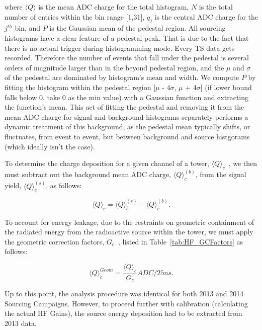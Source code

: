 where $\langle{Q}\rangle$ is the mean ADC charge for the total histogram,
$N$ is the total number of entries within the bin range [1,31], $q_j$ is
the central ADC charge for the $j^{th}$ bin, and $P$ is the Gaussian mean of
the pedestal region. All sourcing histograms have a clear feature of a pedestal
peak. That is due to the fact that there is no actual trigger during
histogramming mode. Every TS data gets recorded. Therefore the number of events
that fall under the pedestal is several orders of magnitude larger than in the
beyond pedestal region, and the $\mu$ and $\sigma$ of the pedestal are dominated
by histogram's mean and width. We compute $P$ by fitting the histogram
within the pedestal region [$\mu$ - 4$\sigma$, $\mu$ + 4$\sigma$]
(if lower bound falls below 0, take 0 as the min value) with a Gaussian function
and extracting the function's mean. This act of fitting the pedestal
and removing it from the mean ADC charge for signal and background histograms
separately performs a dynamic treatment of this
background, as the pedestal mean typically shifts, or fluctuates, from event
to event, but between background and source histgorams (which ideally isn't the case).

To determine the charge deposition for a given channel of a tower,
${\langle{Q}\rangle}_c$~, we then must subtract out the background mean ADC
charge, ${\langle{Q}\rangle}^{(b)}_{c}$, from the signal yield,
${\langle{Q}\rangle}^{(s)}_{c}$, as follows:

\begin{center}
   \begin{equation}
      \label{eq:Sig_Min_Bkg}
      {\langle{Q}\rangle}_{c} = {\langle{Q}\rangle}^{(s)}_{c} - {\langle{Q}\rangle}^{(b)}_{c}.
   \end{equation}
\end{center}

To account for energy leakage, due to the restraints on geometric
containment of the radiated energy from the radioactive source within the tower,
we must apply the geometric correction factors, $G_c$~, listed in
Table~\ref{tab:HF_GCFactors} as follows:

\begin{center}
   \begin{equation}
      \label{eq:Sig_Corr}
      {\langle{Q}\rangle}^{Geom}_{c} = \frac{{\langle{Q}\rangle}_{c}}{G_{c}}\unit{ADC/25ns}.
   \end{equation}
\end{center}

Up to this point, the analysis procedure was identical for both 2013 and 2014
Sourcing Campaigns. However, to proceed further with calibration (calculating the
actual HF Gains), the source energy deposition had to be extracted from 2013 data.

